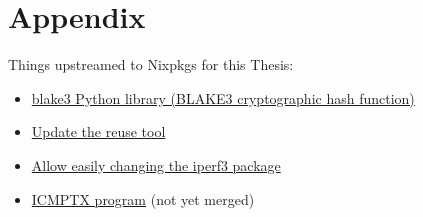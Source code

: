 
\chapter{Appendix}

Things upstreamed to Nixpkgs for this Thesis:
\begin{itemize}
  \item \href{https://github.com/NixOS/nixpkgs/pull/343277}{blake3 Python library (BLAKE3 cryptographic hash function)}
  \item \href{https://github.com/NixOS/nixpkgs/pull/281636}{Update the reuse tool}
  \item \href{https://github.com/NixOS/nixpkgs/pull/333462}{Allow easily changing the iperf3 package}
  \item \href{https://github.com/NixOS/nixpkgs/pull/357574}{ICMPTX program} (not yet merged)
\end{itemize}
